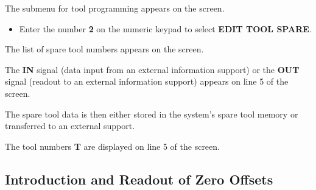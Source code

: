 The submenu for tool programming appears on the screen.

\begin{itemize}
    \item Enter the number \textbf{2} on the numeric keypad to select \textbf{EDIT TOOL SPARE}.
\end{itemize}

The list of spare tool numbers appears on the screen.

\begin{itemize}
\end{itemize}

\vspace{.5cm}

\begin{itemize}
\end{itemize}

The \textbf{IN} signal (data input from an external information support) or the \textbf{OUT} signal (readout to an external information support) appears on line 5 of the screen.

The spare tool data is then either stored in the system’s spare tool memory or transferred to an external support.

The tool numbers \textbf{T} are displayed on line 5 of the screen.

\newpage

\subsection{Introduction and Readout of Zero Offsets}

\begin{itemize}
\end{itemize}

\vspace{.5cm}

\begin{itemize}
\end{itemize}

\vspace{.5cm}

\begin{itemize}
\end{itemize}

